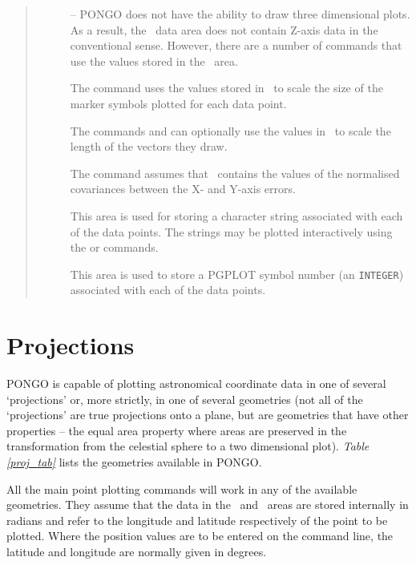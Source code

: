 \begin{quote}
\begin{description}
\item [\zcol] -- PONGO does not have the ability to draw three
dimensional plots.
As a result, the \zcol\ data area does not contain Z-axis data in the
conventional sense.
However, there are a number of commands that use the values stored in the
\zcol\ area.

The command  uses the values stored in \zcol\ to
scale the size of the marker symbols plotted for each data point.

The commands  and  can optionally
use the values in \zcol\ to scale the length of the vectors they draw.

The command  assumes that \zcol\ contains the
values of the normalised covariances between the X- and Y-axis errors.

\item [\labcol] This area is used for storing a character string
associated with each of the data points.  The strings may be plotted
interactively using the  or 
commands.

\item [\symcol] This area is used to store a PGPLOT symbol number (an
\verb+INTEGER+) associated with each of the data points.

\end{description}
\end{quote}


\section{Projections} \label{proj_sect}

PONGO is capable of plotting astronomical coordinate data in one of several
`projections' or, more strictly, in one of several geometries (not all of the
`projections' are true projections onto a plane, but are geometries that have
other properties -- \eg the equal area property where areas are preserved in
the transformation from the celestial sphere to a two dimensional plot).
{\em Table \ref{proj_tab}} lists the geometries available in PONGO.

All the main point plotting commands will work in any of the available
geometries.
They assume that the data in the \xcol\ and \ycol\ areas are stored internally
in radians and refer to the longitude and latitude respectively of the point to
be plotted.
Where the position values are to be entered on the command line, the latitude
and longitude are normally given in degrees.

